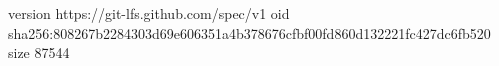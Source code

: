 version https://git-lfs.github.com/spec/v1
oid sha256:808267b2284303d69e606351a4b378676cfbf00fd860d132221fc427dc6fb520
size 87544
